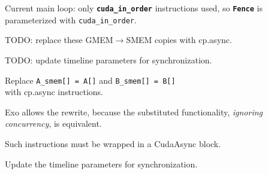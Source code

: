 \newpage
{}

{\large

}

{\LARGE
Current main loop:
only \textbf{\texttt{cuda\_in\_order}} instructions used,
so \textbf{\texttt{Fence}} is parameterized with \texttt{cuda\_in\_order}.
}

\newpage
{}

{\large

}

{\LARGE
TODO: replace these GMEM$\to$SMEM copies with cp.async.
}

\newpage
{}

{\large

}

{\LARGE
TODO: update timeline parameters for synchronization.
}

\newpage
{}

{\large

}

{\LARGE

Replace \texttt{A\_smem[] = A[]} and \texttt{B\_smem[] = B[]}\\with cp.async instructions.

Exo allows the rewrite, because the substituted functionality, \textit{ignoring concurrency}, is equivalent.

}

\newpage
{}

{\large

}

{\LARGE

Such instructions must be wrapped in a CudaAsync block.

}

\newpage
{}

{\large

}

{\LARGE

Update the timeline parameters for synchronization.

}

\newpage
{}
\begin{center}
\Large
\begin{tikzpicture}[node distance=0mm]

\end{tikzpicture}
\end{center}


